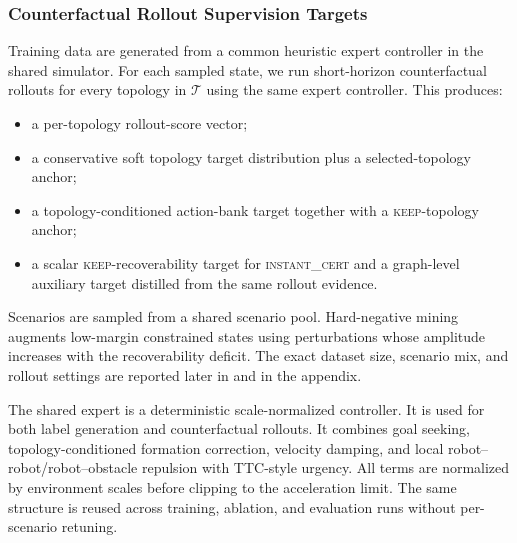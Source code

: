 \documentclass{ieeeaccess}
\newcommand{\cT}{\mathcal{T}}
\begin{document}
\subsubsection{Counterfactual Rollout Supervision Targets}
Training data are generated from a common heuristic expert controller in
the shared simulator. For each sampled state, we run short-horizon
counterfactual rollouts for every topology in $\cT$ using the same
expert controller. This produces:
\begin{itemize}
    \item a per-topology rollout-score vector;
    \item a conservative soft topology target distribution plus a selected-topology anchor;
    \item a topology-conditioned action-bank target together with a
    \textsc{keep}-topology anchor;
    \item a scalar \textsc{keep}-recoverability target for
    \textsc{instant\_cert} and a graph-level auxiliary target distilled from the same rollout evidence.
\end{itemize}
Scenarios are sampled from a shared scenario pool. Hard-negative mining
augments low-margin constrained states using perturbations whose
amplitude increases with the recoverability deficit. The exact dataset
size, scenario mix, and rollout settings are reported later in
 and in the appendix.

The shared expert is a deterministic scale-normalized controller. It is
used for both label generation and counterfactual rollouts. It combines
goal seeking, topology-conditioned formation correction, velocity
damping, and local robot--robot/robot--obstacle repulsion with
TTC-style urgency. All terms are normalized by environment scales
before clipping to the acceleration limit. The same structure is reused
across training, ablation, and evaluation runs without per-scenario
retuning.
\end{document}
